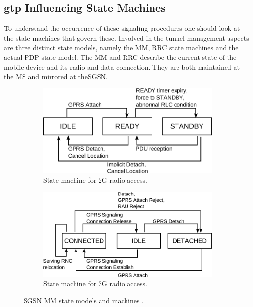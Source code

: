 \subsection{\texorpdfstring{\acrshort{gtp}}{GTP} Influencing State Machines}

To understand the occurrence of these signaling procedures one should look at the state machines that govern these. Involved in the tunnel management aspects are three distinct state models, namely the \gls{MM}, \gls{RRC} state machines and the actual \gls{PDP} state model. The \gls{MM} and \gls{RRC} describe the current state of the mobile device and its radio and data connection. They are both maintained at the \gls{MS} and mirrored at the\gls{SGSN}.

\begin{figure}[htb]
        \centering
        \begin{subfigure}[b]{0.60\textwidth}
            \centering
			\includegraphics[width=\textwidth]{images/mm-2g-state-model.pdf}
			\caption{State machine for \gls{2G} radio access.}
			\label{c4:fig:2g-mmstatemodel}
        \end{subfigure}%

        \begin{subfigure}[b]{0.70\textwidth}
			\centering
			\includegraphics[width=\textwidth]{images/mm-3g-state-model.pdf}
			\caption{State machine for \gls{3G} radio access.}
			\label{c4:fig:3g-mmstatemodel}
		   \end{subfigure}%
 \caption{\gls{SGSN} \gls{MM} state models and machines \cite[Section~6.1]{3gpp.23.060}.}
\label{c4:fig:mmstatemodel}
\end{figure}

